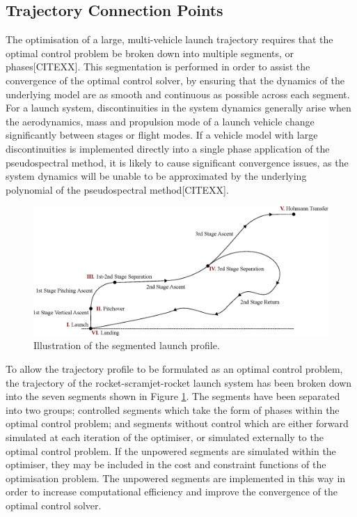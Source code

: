 \subsection{Trajectory Connection Points}
The optimisation of a large, multi-vehicle launch trajectory requires that the optimal control problem be broken down into multiple segments, or phases[CITEXX]. This segmentation is performed in order to assist the convergence of the optimal control solver, by ensuring that the dynamics of the underlying model are as smooth and continuous as possible across each segment. 
For a launch system, discontinuities in the system dynamics generally arise when the aerodynamics, mass and propulsion mode of a launch vehicle change significantly between stages or flight modes. 
If a vehicle model with large discontinuities is implemented directly into a single phase application of the pseudospectral method, it is likely to cause significant convergence issues, as the system dynamics will be unable to be approximated by the underlying polynomial of the pseudospectral method[CITEXX]. 
 \begin{figure}[ht]
 	\centering
 	\includegraphics[width=1.\linewidth]{figures/4_LODESTAR/Traj}
 	\caption{Illustration of the segmented launch profile.}
 	\label{fig:Traj}
 \end{figure}
 
 To allow the trajectory profile to be formulated as an optimal control problem, the trajectory of the rocket-scramjet-rocket launch system has been broken down into the seven segments shown in Figure \ref{fig:Traj}. 
  The segments have been separated into two groups; controlled segments which take the form of phases within the optimal control problem; and segments without control which are either forward simulated at each iteration of the optimiser, or simulated externally to the optimal control problem. If the unpowered segments are simulated within the optimiser, they may be included in the cost and constraint functions of the optimisation problem.
  The unpowered segments are implemented in this way in order to increase computational efficiency and improve the convergence of the optimal control solver. 
  
